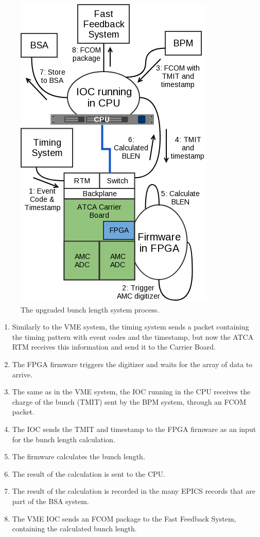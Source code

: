 \documentclass[letter,
        biblatex,   %
        keeplastbox,  %
        ]{jacow}
\begin{document}
\begin{figure}[!htb]
  \centering
  \includegraphics*[width=.8\columnwidth]{BLEN_ATCA_Process}
  \caption{The upgraded bunch length system process.}
  \label{fig:blen_atca}
\end{figure}

\begin{enumerate}
  \item Similarly to the VME system, the timing system sends a packet containing the timing pattern with event codes and the timestamp, but now the ATCA RTM receives this information and send it to the Carrier Board.
  \item The FPGA firmware triggers the digitizer and waits for the array of data to arrive.
  \item The same as in the VME system, the IOC running in the CPU receives the charge of the bunch (TMIT) sent by the BPM system, through an FCOM packet.
  \item The IOC sends the TMIT and timestamp to the FPGA firmware as an input for the bunch length calculation.
  \item The firmware calculates the bunch length.
  \item The result of the calculation is sent to the CPU.
  \item The result of the calculation is recorded in the many EPICS records that are part of the BSA system.
  \item The VME IOC sends an FCOM package to the Fast Feedback System, containing the calculated bunch length.
\end{enumerate}
\end{document}

